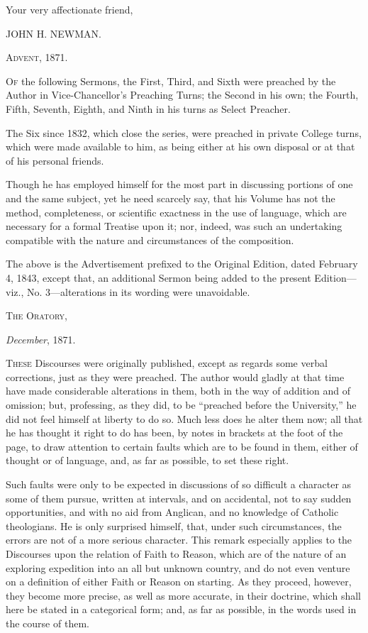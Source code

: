 Your very affectionate friend,

JOHN H. NEWMAN.


A\textsc{dvent}, 1871.








O\textsc{f} the following Sermons, the First, Third, and Sixth were preached
by the Author in Vice-Chancellor's Preaching Turns; the Second in his
own; the Fourth, Fifth, Seventh, Eighth, and Ninth in his turns as
Select Preacher.


The Six since 1832, which close the series, were preached in
private College turns, which were made available to him, as being
either at his own disposal or at that of his personal friends.


Though he has employed himself for the most part in discussing
portions of one and the same subject, yet he need scarcely say, that
his Volume has not the method, completeness, or scientific exactness
in the use of language, which are necessary for a formal Treatise upon
it; nor, indeed, was such an undertaking compatible with the nature
and circumstances of the composition.


The above is the Advertisement prefixed to the Original Edition,
dated February 4, 1843, except that, an additional Sermon being added
to the present Edition—viz., No. 3—alterations in its wording were
unavoidable.


T\textsc{he} O\textsc{ratory},

\emph{December}, 1871.








T\textsc{hese} Discourses were originally published, except as regards some
verbal corrections, just as they were preached. The author would
gladly at that time have made considerable alterations in them, both
in the way of addition and of omission; but, professing, as they did,
to be ``preached before the University,'' he did not feel
himself at liberty to do so. Much less does he alter them now; all
that he has thought it right to do has been, by notes in brackets at
the foot of the page, to draw attention to certain faults which are to
be found in them, either of thought or of language, and, as far as
possible, to set these right.


Such faults were only to be expected in discussions of so difficult
a character as some of them pursue, written at intervals, and on
accidental, not to say sudden opportunities, and with no aid from
Anglican, and no knowledge of Catholic theologians. He is only
surprised himself, that, under such circumstances, the errors are not
of a more serious character. This remark especially applies to the
Discourses upon the relation of Faith to Reason, which are of the
nature of an exploring expedition into an all but unknown country, and
do not even venture on a definition of either Faith or Reason on
starting. As they proceed, however, they become more precise, as well
as more accurate, in their doctrine, which shall here be stated in a
categorical form; and, as far as possible, in the words used in the
course of them.


